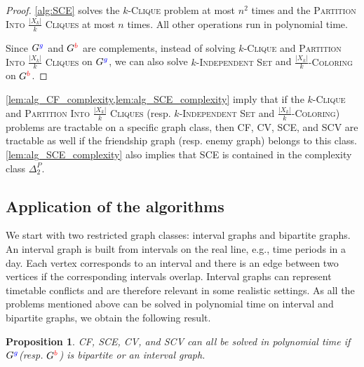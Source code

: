 \documentclass[a4paper,fleqn]{cas-sc}
\newcommand{\friendshipColor}{blue}
\newcommand{\enemyColor}{red}
\newcommand{\agentSetInMaxCoalition}{\ensuremath{X}\xspace}
\newcommand{\friendSuperscript}{{\color{\friendshipColor}g}}
\newcommand{\enemySuperscript}{{\color{\enemyColor}b}}
\newcommand{\friendshipGraph}{\ensuremath{G^{\friendSuperscript}}\xspace}
\newcommand{\enemyGraph}{\ensuremath{G^{\enemySuperscript}}\xspace}
\newcommand{\probname}[1]{\textsc{#1}}
\newcommand{\kclique}[1]{\probname{#1-Clique}\xspace}
\newcommand{\kIS}[1]{\probname{#1-Independent Set}\xspace}
\newcommand{\partitionIntokCliques}[1]{\probname{Partition Into #1 Cliques} \xspace}
\newcommand{\kColouring}[1]{\probname{#1-Coloring}\xspace}
\newcommand{\SCE}{SCE\xspace}
\newcommand{\SCV}{SCV\xspace}
\newcommand{\CF}{CF\xspace}
\newcommand{\CV}{CV\xspace}
\newtheorem{proposition}{Proposition}
\begin{document}
\begin{proof}
\cref{alg:SCE} solves the \kclique{$k$} problem at most $n^2$ times and the \partitionIntokCliques{$\frac{|\agentSetInMaxCoalition_k|}{k}$} at most $n$ times. All other operations run in polynomial time.
      
Since \friendshipGraph and \enemyGraph are complements, instead of solving \kclique{$k$} and \partitionIntokCliques{$\frac{|\agentSetInMaxCoalition_k|}{k}$} on \friendshipGraph, we can also solve \kIS{$k$} and \kColouring{$\frac{|\agentSetInMaxCoalition_k|}{k}$} on \enemyGraph. 
\end{proof}

\cref{lem:alg_CF_complexity,lem:alg_SCE_complexity} imply that if the \kclique{$k$} and \partitionIntokCliques{$\frac{|\agentSetInMaxCoalition_k|}{k}$} (resp. \kIS{$k$} and \kColouring{$\frac{|\agentSetInMaxCoalition_k|}{k}$}) problems are tractable on a specific graph class, then \CF, \CV, \SCE, and \SCV are tractable as well if the friendship graph (resp. enemy graph) belongs to this class. 
\cref{lem:alg_SCE_complexity} also implies that \SCE is contained in the complexity class $\Delta^P_2$.


\subsection{Application of the algorithms}

We start with two restricted graph classes: interval graphs and bipartite graphs. An interval graph is built from intervals on the real line, e.g., time periods in a day. Each vertex corresponds to an interval and there is an edge between two vertices if the corresponding intervals overlap. Interval graphs can represent timetable conflicts and are therefore relevant in some realistic settings.
As all the problems mentioned above can be solved in polynomial time on interval and bipartite graphs, we obtain the following result. 







\begin{proposition}
\CF, \SCE, \CV, and \SCV can all be solved in polynomial time if \friendshipGraph (resp. \enemyGraph) is bipartite or an interval graph.
\label{prop:SCE_alg_interval_bipartite}
\end{proposition}
\end{document}

